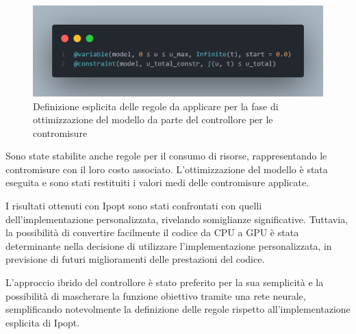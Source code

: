 \begin{figure}[H]
	\begin{center}
		\includegraphics[width=\textwidth]{img/controller_rules_1.png}
		\caption{Definizione esplicita delle regole da applicare per la fase di ottimizzazione del modello da parte del controllore per le contromisure}
		\label{fig:controller_rules_1}	
    \end{center}
\end{figure}

Sono state stabilite anche regole per il consumo di risorse, 
rappresentando le contromisure con il loro costo associato. 
L'ottimizzazione del modello è stata eseguita e sono stati restituiti 
i valori medi delle contromisure applicate.

I risultati ottenuti con Ipopt sono stati confrontati con quelli 
dell'implementazione personalizzata, rivelando somiglianze 
significative. Tuttavia, la possibilità di convertire facilmente 
il codice da CPU a GPU è stata determinante nella decisione di 
utilizzare l'implementazione personalizzata, in previsione di futuri 
miglioramenti delle prestazioni del codice.

L'approccio ibrido del controllore è stato preferito per la sua 
semplicità e la possibilità di mascherare la funzione obiettivo 
tramite una rete neurale, semplificando notevolmente la definizione 
delle regole rispetto all'implementazione esplicita di Ipopt.

